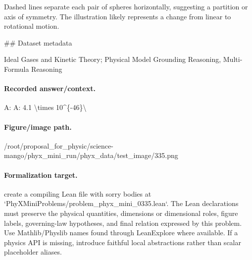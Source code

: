 Dashed lines separate each pair of spheres horizontally, suggesting a partition or axis of symmetry. The illustration likely represents a change from linear to rotational motion.

\#\# Dataset metadata

Ideal Gases and Kinetic Theory; Physical Model Grounding Reasoning, Multi-Formula Reasoning

\paragraph{Recorded answer/context.}
A: A: 4.1 \textbackslash{}times 10\textasciicircum{}\{-46\}\textbackslash{}

\paragraph{Figure/image path.}
/root/proposal\_for\_physic/science-mango/phyx\_mini\_run/phyx\_data/test\_image/335.png

\paragraph{Formalization target.}
create a compiling Lean file with sorry bodies at `PhyXMiniProblems/problem\_phyx\_mini\_0335.lean`. The Lean declarations must preserve the physical quantities, dimensions or dimensional roles, figure labels, governing-law hypotheses, and final relation expressed by this problem.
Use Mathlib/Physlib names found through LeanExplore where available. If a physics API is missing, introduce faithful local abstractions rather than scalar placeholder aliases.

